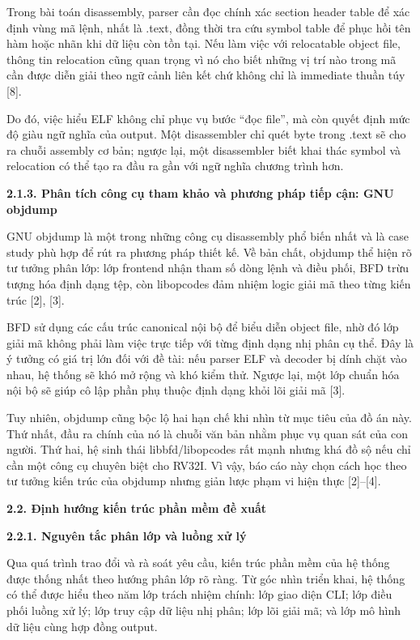\documentclass[
]{article}
\begin{document}
Trong bài toán disassembly, parser cần đọc chính xác section header
table để xác định vùng mã lệnh, nhất là .text, đồng thời tra cứu symbol
table để phục hồi tên hàm hoặc nhãn khi dữ liệu còn tồn tại. Nếu làm
việc với relocatable object file, thông tin relocation cũng quan trọng
vì nó cho biết những vị trí nào trong mã cần được diễn giải theo ngữ
cảnh liên kết chứ không chỉ là immediate thuần túy {[}8{]}.

Do đó, việc hiểu ELF không chỉ phục vụ bước ``đọc file'', mà còn quyết
định mức độ giàu ngữ nghĩa của output. Một disassembler chỉ quét byte
trong .text sẽ cho ra chuỗi assembly cơ bản; ngược lại, một disassembler
biết khai thác symbol và relocation có thể tạo ra đầu ra gần với ngữ
nghĩa chương trình hơn.

\textbf{2.1.3. Phân tích công cụ tham khảo và phương pháp tiếp cận: GNU
objdump}

GNU objdump là một trong những công cụ disassembly phổ biến nhất và là
case study phù hợp để rút ra phương pháp thiết kế. Về bản chất, objdump
thể hiện rõ tư tưởng phân lớp: lớp frontend nhận tham số dòng lệnh và
điều phối, BFD trừu tượng hóa định dạng tệp, còn libopcodes đảm nhiệm
logic giải mã theo từng kiến trúc {[}2{]}, {[}3{]}.

BFD sử dụng các cấu trúc canonical nội bộ để biểu diễn object file, nhờ
đó lớp giải mã không phải làm việc trực tiếp với từng định dạng nhị phân
cụ thể. Đây là ý tưởng có giá trị lớn đối với đề tài: nếu parser ELF và
decoder bị dính chặt vào nhau, hệ thống sẽ khó mở rộng và khó kiểm thử.
Ngược lại, một lớp chuẩn hóa nội bộ sẽ giúp cô lập phần phụ thuộc định
dạng khỏi lõi giải mã {[}3{]}.

Tuy nhiên, objdump cũng bộc lộ hai hạn chế khi nhìn từ mục tiêu của đồ
án này. Thứ nhất, đầu ra chính của nó là chuỗi văn bản nhằm phục vụ quan
sát của con người. Thứ hai, hệ sinh thái libbfd/libopcodes rất mạnh
nhưng khá đồ sộ nếu chỉ cần một công cụ chuyên biệt cho RV32I. Vì vậy,
báo cáo này chọn cách học theo tư tưởng kiến trúc của objdump nhưng giản
lược phạm vi hiện thực {[}2{]}--{[}4{]}.

\textbf{2.2. Định hướng kiến trúc phần mềm đề xuất}

\textbf{2.2.1. Nguyên tắc phân lớp và luồng xử lý}

Qua quá trình trao đổi và rà soát yêu cầu, kiến trúc phần mềm của hệ
thống được thống nhất theo hướng phân lớp rõ ràng. Từ góc nhìn triển
khai, hệ thống có thể được hiểu theo năm lớp trách nhiệm chính: lớp giao
diện CLI; lớp điều phối luồng xử lý; lớp truy cập dữ liệu nhị phân; lớp
lõi giải mã; và lớp mô hình dữ liệu cùng hợp đồng output.
\end{document}
